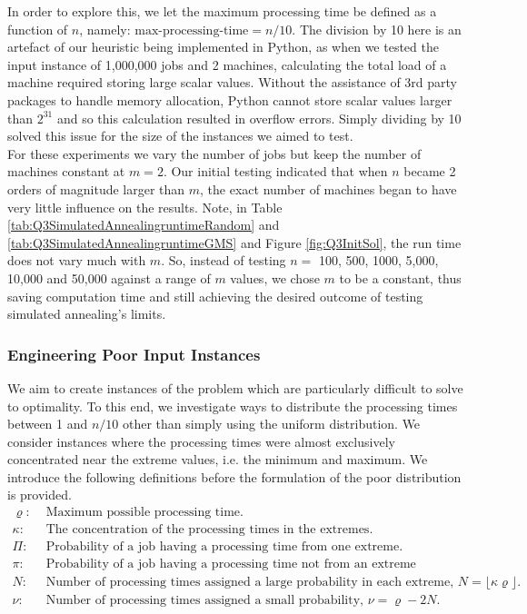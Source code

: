\documentclass[12pt,a4paper,reqno]{article}
\begin{document}
In order to explore this, we let the maximum processing time be defined as a function of $n$, namely: $\text{max-processing-time}=n/10$. The division by 10 here is an artefact of our heuristic being implemented in Python, as when we tested the input instance of 1,000,000 jobs and 2 machines, calculating the total load of a machine required storing large scalar values. Without the assistance of 3rd party packages to handle memory allocation, Python cannot store scalar values larger than $2^{31}$ and so this calculation resulted in overflow errors. Simply dividing by 10 solved this issue for the size of the instances we aimed to test. \\

For these experiments we vary the number of jobs but keep the number of machines constant at $m=2$. Our initial testing indicated that when $n$ became 2 orders of magnitude larger than $m$, the exact number of machines began to have very little influence on the results. Note, in Table \ref{tab:Q3SimulatedAnnealingruntimeRandom} and  \ref{tab:Q3SimulatedAnnealingruntimeGMS} and Figure \ref{fig:Q3InitSol}, the run time does not vary much with $m$. So, instead of testing $n=$ 100, 500, 1000, 5,000, 10,000 and 50,000 against a range of $m$ values, we chose $m$ to be a constant, thus saving computation time and still achieving the desired outcome of testing simulated annealing's limits. \\

\subsubsection{Engineering Poor Input Instances}
We aim to create instances of the problem which are particularly difficult to solve to optimality. To this end, we investigate ways to distribute the processing times between 1 and $n/10$ other than simply using the uniform distribution. We consider instances where the processing times were almost exclusively concentrated near the extreme values, i.e. the minimum and maximum. We introduce the following definitions before the formulation of the poor distribution is provided.
\begin{align}
\varrho: & \text{ Maximum possible processing time.} \nonumber\\
\kappa: & \text{ The concentration of the processing times in the extremes.} \nonumber\\
\Pi: & \text{ Probability of a job having a processing time from one extreme.} \nonumber\\
\pi: & \text{ Probability of a job having a processing time not from an extreme} \nonumber\\
N: & \text{ Number of processing times assigned a large probability in each extreme, } N =\lfloor \kappa\varrho \rfloor. \nonumber\\
\nu: & \text{ Number of processing times assigned a small probability, } \nu =\varrho - 2N. \nonumber
\
\end{align}
\end{document}
